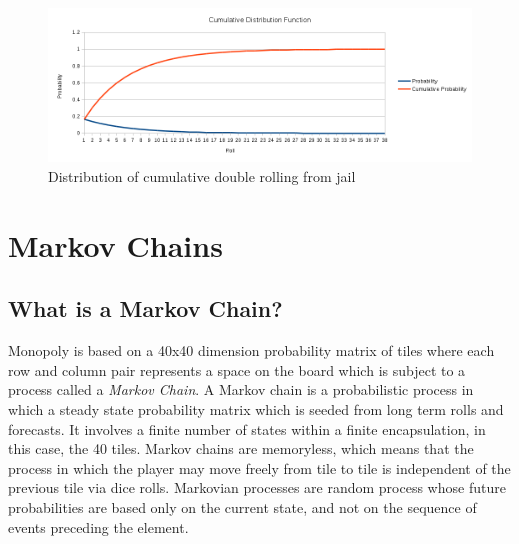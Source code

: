 \documentclass[12pt]{article}
\begin{document}
\begin{figure}[h]
\centering
\includegraphics[width=1\textwidth]{CDF.png}
\caption{Distribution of cumulative double rolling from jail}
\end{figure}

\section{Markov Chains}
\subsection{What is a Markov Chain?}
Monopoly is based on a 40x40 dimension probability matrix of tiles where each row and column pair represents a space on the board which is subject to a process called a \emph{Markov Chain}. A Markov chain is a probabilistic process in which a steady state probability matrix which is seeded from long term rolls and forecasts. It involves a finite number of states within a finite encapsulation, in this case, the 40 tiles. Markov chains are memoryless, which means that the process in which the player may move freely from tile to tile is independent of the previous tile via dice rolls. Markovian processes are random process whose future probabilities are based only on the current state, and not on the sequence of events preceding the element.\cite{snellj}
\end{document}
